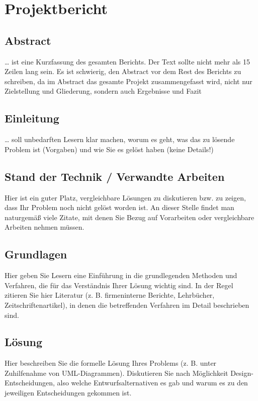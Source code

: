 \section{Projektbericht}



\subsection{Abstract}
… ist eine Kurzfassung des gesamten Berichts. Der Text sollte nicht mehr als
15 Zeilen lang sein. Es ist schwierig, den Abstract vor dem Rest des Berichts zu
schreiben, da im Abstract das gesamte Projekt zusammengefasst wird, nicht
nur Zielstellung und Gliederung, sondern auch Ergebnisse und Fazit


\subsection{Einleitung}
… soll unbedarften Lesern klar machen, worum es geht, was das zu lösende
Problem ist (Vorgaben) und wie Sie es gelöst haben (keine Details!)


\subsection{Stand der Technik / Verwandte Arbeiten}
Hier ist ein guter Platz, vergleichbare Lösungen zu diskutieren bzw. zu
zeigen, dass Ihr Problem noch nicht gelöst worden ist. An dieser Stelle findet
man naturgemäß viele Zitate, mit denen Sie Bezug auf Vorarbeiten oder
vergleichbare Arbeiten nehmen müssen.


\subsection{Grundlagen}
Hier geben Sie Lesern eine Einführung in die grundlegenden Methoden
und Verfahren, die für das Verständnis Ihrer Lösung wichtig sind. In der
Regel zitieren Sie hier Literatur (z. B. firmeninterne Berichte, Lehrbücher,
Zeitschriftenartikel), in denen die betreffenden Verfahren im Detail
beschrieben sind.


\subsection{Lösung}
Hier beschreiben Sie die formelle Lösung Ihres Problems (z. B. unter
Zuhilfenahme von UML-Diagrammen). Diskutieren Sie nach Möglichkeit
Design-Entscheidungen, also welche Entwurfsalternativen es gab und warum es zu den jeweiligen
Entscheidungen gekommen ist.


